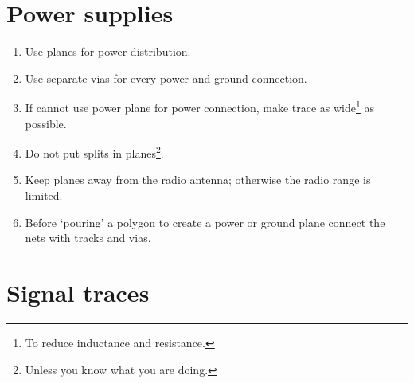 \section{Power supplies}

\begin{enumerate}

\item Use planes for power distribution.

\item Use separate vias for every power and ground connection.

\item If cannot use power plane for power connection, make trace as
  wide\footnote{To reduce inductance and resistance.} as possible.

\item Do not put splits in planes\footnote{Unless you know what you
  are doing.}.

\item Keep planes away from the radio antenna; otherwise the radio
  range is limited.

\item Before `pouring' a polygon to create a power or ground plane
  connect the nets with tracks and vias.
\end{enumerate}


\section{Signal traces}

